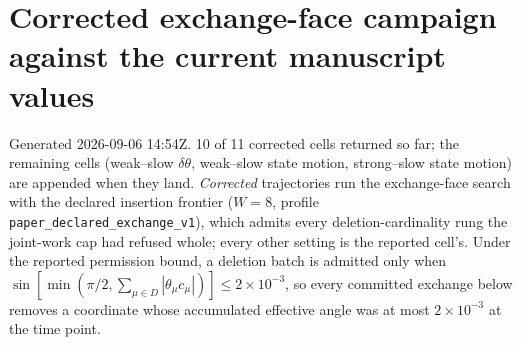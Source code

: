 \documentclass[10pt]{article}
\begin{document}
\section*{Corrected exchange-face campaign against the current manuscript values}
Generated 2026-09-06 14:54Z.  10 of 11 corrected cells returned so far; the remaining cells (weak--slow $\delta\theta$, weak--slow state motion, strong--slow state motion) are appended when they land.  \emph{Corrected} trajectories run the exchange-face search with the declared insertion frontier ($W=8$, profile \texttt{paper\_declared\_exchange\_v1}), which admits every deletion-cardinality rung the joint-work cap had refused whole; every other setting is the reported cell's.  Under the reported permission bound, a deletion batch is admitted only when $\sin[\min(\pi/2,\sum_{\mu\in D}|\theta_\mu c_\mu|)]\le2\times10^{-3}$, so every committed exchange below removes a coordinate whose accumulated effective angle was at most $2\times10^{-3}$ at the time point.
\end{document}

